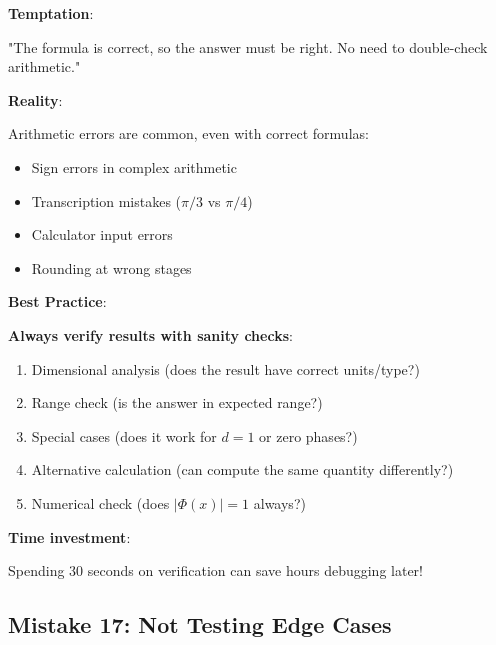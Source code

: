 \begin{warning}
\textbf{Temptation}:

"The formula is correct, so the answer must be right. No need to double-check arithmetic."

\textbf{Reality}:

Arithmetic errors are common, even with correct formulas:
\begin{itemize}
\item Sign errors in complex arithmetic
\item Transcription mistakes ($\pi/3$ vs $\pi/4$)
\item Calculator input errors
\item Rounding at wrong stages
\end{itemize}

\textbf{Best Practice}:

\textbf{Always verify results with sanity checks}:
\begin{enumerate}
\item Dimensional analysis (does the result have correct units/type?)
\item Range check (is the answer in expected range?)
\item Special cases (does it work for $d=1$ or zero phases?)
\item Alternative calculation (can compute the same quantity differently?)
\item Numerical check (does $|\Phi(x)| = 1$ always?)
\end{enumerate}

\textbf{Time investment}:

Spending 30 seconds on verification can save hours debugging later!
\end{warning}

\subsection{Mistake 17: Not Testing Edge Cases}


